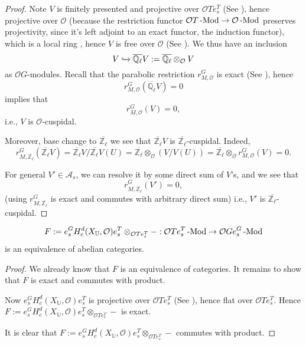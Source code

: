 \begin{proof}
		Note $V$ is finitely presented and projective over $\mathcal{O}Te_s^T$ (See \cite[Proof of Theorem 3.3]{broue1990isometries}), hence projective over $\mathcal{O}$ (because the restriction functor $\mathcal{O}T\operatorname{-Mod} \to \mathcal{O}\operatorname{-Mod}$ preserves projectivity, since it's left adjoint to an exact functor, the induction functor), which is a local ring 
		, hence $V$ is free over $\mathcal{O}$ (See \cite[Theorem 24.4.5]{vakil2017rising}). We thus have an inclusion
		$$V \xhookrightarrow[]{} \overline{\mathbb{Q}_{\ell}}V:=\overline{\mathbb{Q}_{\ell}}\otimes_{\mathcal{O}}V %
		$$
		as $\mathcal{O}G$-modules.
		Recall that the parabolic restriction $r^G_{M, \mathcal{O}}$ is exact (See \cite[II.2.1]{vigneras1996representations}), hence 
		$$r^G_{M, \mathcal{O}}(\overline{\mathbb{Q}_{\ell}}V)=0$$
		implies that 
		$$r^G_{M, \mathcal{O}}(V)=0,$$
		i.e., $V$ is $\mathcal{O}$-cuspidal. 
		
		Moreover, base change to $\overline{\mathbb{Z}_{\ell}}$ we see that $\overline{\mathbb{Z}_{\ell}}V$ is $\overline{\mathbb{Z}_{\ell}}$-cuspidal. Indeed, 
		$$r^G_{M, \overline{\mathbb{Z}_{\ell}}}(\overline{\mathbb{Z}_{\ell}}V)=\overline{\mathbb{Z}_{\ell}}V/\overline{\mathbb{Z}_{\ell}}V(U)=\overline{\mathbb{Z}_{\ell}}\otimes_{\mathcal{O}}(V/V(U))=\overline{\mathbb{Z}_{\ell}}\otimes_{\mathcal{O}}r^G_{M, \mathcal{O}}(V)=0.$$
		
		For general $V' \in \mathcal{A}_s$, we can resolve it by some direct sum of $V$'s, and we see that
		$$r^G_{M, \overline{\mathbb{Z}_{\ell}}}(V')=0,$$
		(using $r^G_{M, \overline{\mathbb{Z}_{\ell}}}$ is exact and commutes with arbitrary direct sum) i.e., $V'$ is $\overline{\mathbb{Z}_{\ell}}$-cuspidal.
	\end{proof}
	

	

	
	\begin{lemma}\label{Lem abelian}
		$$F:=e_s^GH^d_c(X_{\mathbb{U}}, \mathcal{O})e_s^T\otimes_{\mathcal{O}Te_s^T}-: \mathcal{O}Te_s^T\operatorname{-Mod} \to \mathcal{O}Ge_s^G\operatorname{-Mod}$$ is an equivalence of abelian categories.
	\end{lemma}
	
	\begin{proof}
		We already know that $F$ is an equivalence of categories. It remains to show that $F$ is exact and commutes with product.
		
		Now $e_s^GH^d_c(X_{\mathbb{U}}, \mathcal{O})e_s^T$ is projective over ${\mathcal{O}Te_s^T}$ (See \cite[Proof of Theorem 3.3]{broue1990isometries}), hence flat over ${\mathcal{O}Te_s^T}$. Hence $F:=e_s^GH^d_c(X_{\mathbb{U}}, \mathcal{O})e_s^T\otimes_{\mathcal{O}Te_s^T}-$ is exact.
		
		It is clear that $F:=e_s^GH^d_c(X_{\mathbb{U}}, \mathcal{O})e_s^T\otimes_{\mathcal{O}Te_s^T}-$ commutes with product.
	\end{proof}

